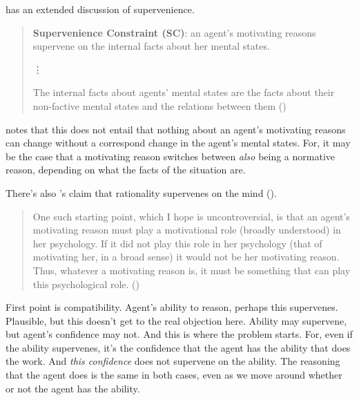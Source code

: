 \documentclass[10pt]{article}
\begin{document}
\textcite{Singh:2019aa} has an extended discussion of supervenience.

\begin{quote}
  \textbf{Supervenience Constraint (SC)}: an agent’s motivating reasons supervene on the internal facts about her mental states.

  \vdots

  The internal facts about agents’ mental states are the facts about their non-factive mental states and the relations between them\nolinebreak
  \mbox{}\hfill\mbox{(\citeyear[6]{Singh:2019aa})}
\end{quote}

\citeauthor{Singh:2019aa} notes that this does not entail that nothing about an agent's motivating reasons can change without a correspond change in the agent's mental states.
For, it may be the case that a motivating reason switches between \emph{also} being a normative reason, depending on what the facts of the situation are.

{
  \color{red}
  There's also \citeauthor{Broome:2013aa}'s claim that rationality supervenes on the mind (\citeyear[151, etc.]{Broome:2013aa}).
}

\begin{quote}
  One such starting point, which I hope is uncontroversial, is that an agent’s motivating reason must play a motivational role (broadly understood) in her psychology.
  If it did not play this role in her psychology (that of motivating her, in a broad sense) it would not be her motivating reason.
  Thus, whatever a motivating reason is, it must be something that can play this psychological role.\nolinebreak
  \mbox{}\hfill\mbox{(\citeyear[4]{Singh:2019aa})}
\end{quote}

\begin{note}[Compatibility]
  First point is compatibility.
  Agent's ability to reason, perhaps this supervenes.
  Plausible, but this doesn't get to the real objection here.
  Ability may supervene, but agent's confidence may not.
  And this is where the problem starts.
  For, even if the ability supervenes, it's the confidence that the agent has the ability that does the work.
  And \emph{this confidence} does not supervene on the ability.
  The reasoning that the agent does is the same in both cases, even as we move around whether or not the agent has the ability.
\end{note}
\end{document}
